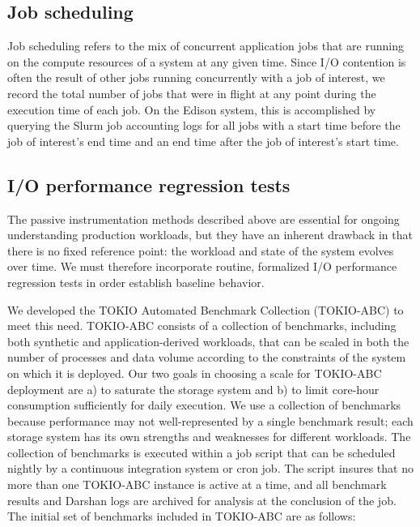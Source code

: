 \subsection{Job scheduling }

Job scheduling refers to the mix of concurrent application jobs that are running on the compute resources of a system at any given time.
Since I/O contention is often the result of other jobs running concurrently with a job of interest, we record the total number of jobs that were in flight at any point during the execution time of each job.
On the Edison system, this is accomplished by querying the Slurm job accounting logs for all jobs with a start time before the job of interest's end time and an end time after the job of interest's start time.

\subsection{I/O performance regression tests} \label{sec:methods/tests}

The passive instrumentation methods described above are essential for
ongoing understanding production workloads, but they have an inherent
drawback in that there is no fixed reference point: the workload
and state of the system evolves over time.  We must therefore incorporate
routine, formalized I/O performance regression tests in order establish baseline behavior.

We developed the TOKIO Automated Benchmark Collection (TOKIO-ABC) to meet
this need.  TOKIO-ABC consists of a collection of benchmarks, including
both synthetic and application-derived workloads, that can be scaled in
both the number of processes and data volume according to the constraints
of the system on which it is deployed. Our two goals in choosing a scale
for TOKIO-ABC deployment are a) to saturate the storage system and b)
to limit core-hour consumption sufficiently for daily execution.  We use
a collection of benchmarks because performance may not well-represented
by a single benchmark result; each storage system has its own strengths
and weaknesses for different workloads.  The collection of benchmarks is
executed within a job script that can be scheduled nightly by a continuous
integration system or cron job.  The script insures that no more than
one TOKIO-ABC instance is active at a time, and all benchmark results
and Darshan logs are archived for analysis at the conclusion of the job.
The initial set of benchmarks included in TOKIO-ABC are as follows:

